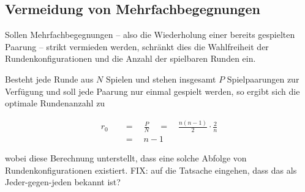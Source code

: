 \documentclass[DIV=15, 10pt]{scrartcl}
\begin{document}
\subsection{Vermeidung von Mehrfachbegegnungen}

Sollen Mehrfachbegegnungen -- also die Wiederholung einer bereits gespielten Paarung -- strikt vermieden werden, schränkt dies die Wahlfreiheit der Rundenkonfigurationen und die Anzahl der spielbaren Runden ein.

Besteht jede Runde aus $N$ Spielen und stehen insgesamt $P$ Spielpaarungen zur Verfügung und soll jede Paarung nur einmal gespielt werden, so ergibt sich die optimale Rundenanzahl zu

\begin{align}
r_0 \quad &= \quad \frac{P}{N} \quad = \quad \frac{n(n-1)}{2} \cdot \frac{2}{n} \nonumber \\[3mm]
&= \quad n - 1
\end{align}

wobei diese Berechnung unterstellt, dass eine solche Abfolge von Rundenkonfigurationen existiert. FIX: auf die Tatsache eingehen, dass das als Jeder-gegen-jeden bekannt ist?
\end{document}
